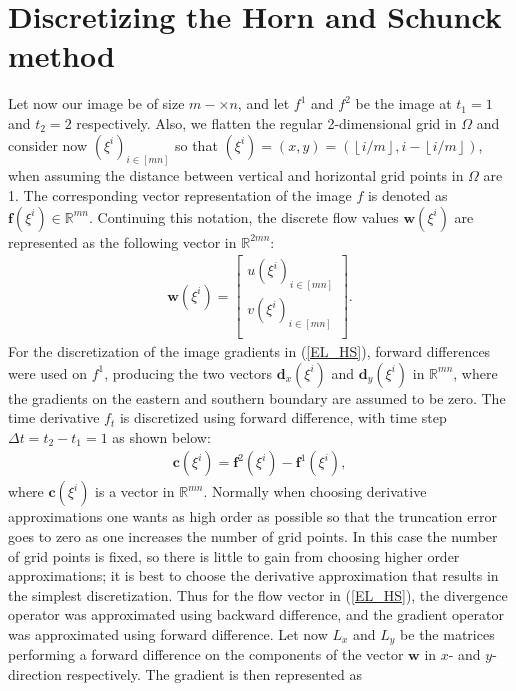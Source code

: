 \section{Discretizing the Horn and Schunck method}
\label{sec: disc}
Let now our image be of size $m-\times n$, and let $f^1$ and $f^2$ be the image at $t_1=1$ and $t_2=2$ respectively. Also, we flatten the regular 2-dimensional grid in $\Omega$ and consider now $(\xi^i)_ {i \in [mn]}$ so that $(\xi^i) = (x,y) = (\left \lfloor{i/m}\right \rfloor, i - \left \lfloor{i/m}\right \rfloor)$, when assuming the distance between vertical and horizontal grid points in $\Omega$ are 1. The corresponding vector representation of the image $f$ is denoted as $\textbf{f}(\xi^i) \in \mathbb{R}^{mn}$. Continuing this notation, the discrete flow values $\textbf{w}(\xi^i)$ are represented as the following vector in $\mathbb{R}^{2mn}$:
\begin{align*}
     \textbf{w}(\xi^i)=\begin{bmatrix}
         u(\xi^i)_{i\in [mn]}  \\
         v(\xi^i)_{i \in [mn]} \\
        \end{bmatrix}.
\end{align*}
For the discretization of the image gradients in (\ref{EL_HS}), forward differences were used on $f^1$, producing the two vectors $\textbf{d}_x(\xi^i)$ and $\textbf{d}_y(\xi^i)$ in $\mathbb{R}^{mn}$, where the gradients on the eastern and southern boundary are assumed to be zero. The time derivative $f_t$ is discretized using forward difference, with time step $\Delta t = t_2 - t_1 = 1$ as shown below:
\begin{align*}
\textbf{c}(\xi^i) = \textbf{f}^2(\xi^i) - \textbf{f}^1(\xi^i),
\end{align*} 
where $\textbf{c}(\xi^i)$ is a vector in $\mathbb{R}^{mn}$. Normally when choosing derivative approximations one wants as high order as possible so that the truncation error goes to zero as one increases the number of grid points. In this case the number of grid points is fixed, so there is little to gain from choosing higher order approximations; it is best to choose the derivative approximation that results in the simplest discretization. Thus for the flow vector in (\ref{EL_HS}), the divergence operator was approximated using backward difference, and the gradient operator was approximated using forward difference. Let now $L_x$ and $L_y$ be the matrices performing a forward difference on the components of the vector $\textbf{w}$ in $x$- and $y$-direction respectively. The gradient is then represented as
